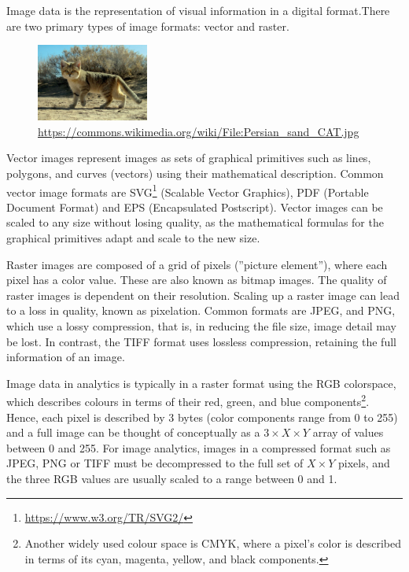 Image data is the representation of visual information in a digital format.There are two primary types of image formats: vector and raster. 

\begin{figure}
\begin{center}
\includegraphics[height=1in]{Persian_sand_CAT.jpg}
\scriptsize\url{https://commons.wikimedia.org/wiki/File:Persian_sand_CAT.jpg}
\end{center}
\end{figure}

Vector images represent images as sets of graphical primitives such as lines, polygons, and curves (vectors) using their mathematical description. Common vector image formats are SVG\footnote{\url{https://www.w3.org/TR/SVG2/}} (Scalable Vector Graphics), PDF (Portable Document Format) and EPS (Encapsulated Postscript). Vector images can be scaled to any size without losing quality, as the mathematical formulas for the graphical primitives adapt and scale to the new size.

Raster images are composed of a grid of pixels (''picture element''), where each pixel has a color value. These are also known as bitmap images. The quality of raster images is dependent on their resolution. Scaling up a raster image can lead to a loss in quality, known as pixelation. Common formats are JPEG, and PNG, which use a lossy compression, that is, in reducing the file size, image detail may be lost. In contrast, the TIFF format uses lossless compression, retaining the full information of an image. 

Image data in analytics is typically in a raster format using the RGB colorspace, which describes colours in terms of their red, green, and blue components\footnote{Another widely used colour space is CMYK, where a pixel's color is described in terms of its cyan, magenta, yellow, and black components.}. Hence, each pixel is described by 3 bytes (color components range from 0 to 255) and a full image can be thought of conceptually as  a $3 \times X \times Y$ array of values between 0 and 255. For image analytics, images in a compressed format such as JPEG, PNG or TIFF must be decompressed to the full set of $X \times Y$ pixels, and the three RGB values are usually scaled to a range between 0 and 1.

